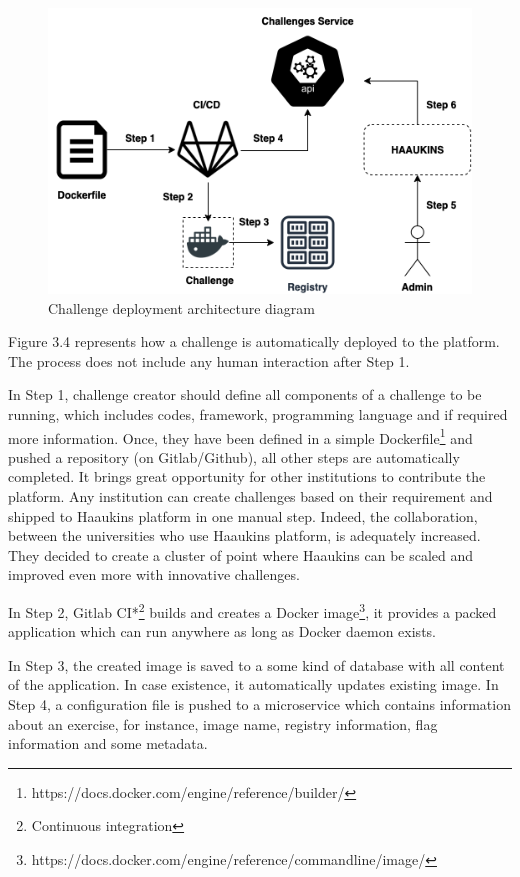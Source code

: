 \begin{figure}[htbp]
\centerline{\includegraphics[scale=.6]{figures/challenge-deployment.png}}
\caption{Challenge deployment architecture diagram }
\label{fig}
\end{figure}
\newpage 
Figure 3.4 represents how a challenge is automatically deployed to the platform. The process does not include any human interaction after Step 1. 

In Step 1, challenge creator should define all components of a challenge to be running, which includes codes, framework, programming language and if required more information. Once, they have been defined in a simple Dockerfile\footnote{https://docs.docker.com/engine/reference/builder/} and pushed a repository (on Gitlab/Github), all other steps are automatically completed.  It brings great opportunity for other institutions to contribute the platform. Any institution can create challenges based on their requirement and shipped to Haaukins platform in one manual step. Indeed, the collaboration, between the universities who use Haaukins platform, is adequately increased. They decided to create a cluster of point where Haaukins can be scaled and improved even more with innovative challenges. 

In Step 2, Gitlab CI*\footnote{Continuous integration} builds and creates a Docker image\footnote{https://docs.docker.com/engine/reference/commandline/image/}, it provides a packed application which can run anywhere as long as Docker daemon exists. 

In Step 3, the created image is saved to a some kind of database with all content of the application. In case existence, it automatically updates existing image. 
In Step 4, a configuration file is pushed to a microservice which contains information about an exercise, for instance, image name, registry information, flag information and some metadata. 

